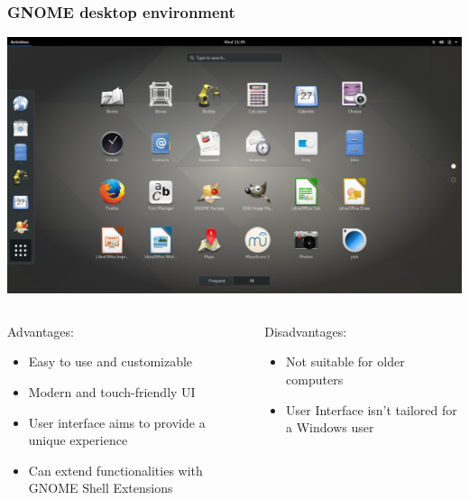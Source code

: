 \begin{frame}
	\frametitle{GNOME desktop environment}
	
	\begin{center}
		\includegraphics[width=.7\linewidth]{../graphics/desktop_examples/gnome.png}
	\end{center}%
	
	\vspace{-\baselineskip}
	
	\begin{columns}
		\begin{column}[t]{.7\linewidth}
			\begin{exampleblock}{Advantages:}
				\begin{itemize}
					\item Easy to use and customizable
					\item Modern and touch-friendly UI
					\item User interface aims to provide a unique experience
					\item Can extend functionalities with GNOME Shell Extensions
				\end{itemize}
			\end{exampleblock}
		\end{column}
		\hfill
		\begin{column}[t]{.28\linewidth}
			\begin{alertblock}{Disadvantages:}
				\begin{itemize}
					\item Not suitable for older computers
					\item User Interface isn’t tailored for a Windows user
				\end{itemize}
			\end{alertblock}
		\end{column}
	\end{columns}
	\hfill
\end{frame}
